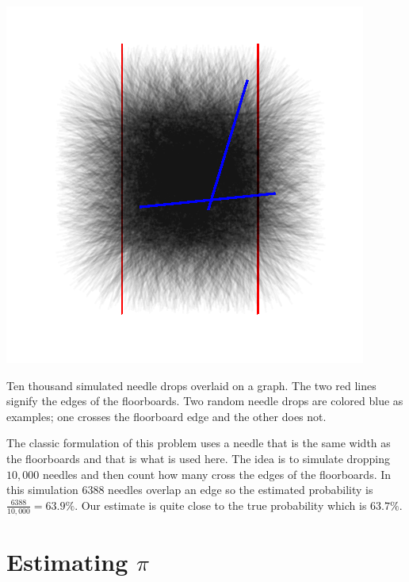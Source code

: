\documentclass{tufte-handout}
\begin{document}
\begin{marginfigure}[-.2in]
  \includegraphics[width=\linewidth]{Rplot02}
  \caption{Ten thousand simulated needle drops overlaid on a graph. The two red lines signify the edges of the floorboards. Two random needle drops are colored blue as examples; one crosses the floorboard edge and the other does not.}
  \label{sim}
\end{marginfigure}

\noindent The classic formulation of this problem uses a needle that is the same width as the floorboards and that is what is used here. The idea is to simulate dropping $10,000$ needles and then count how many cross the edges of the floorboards. In this simulation $6388$ needles overlap an edge so the estimated probability is $ \frac{6388}{10,000} = 63.9\%$. Our estimate is quite close to the true probability which is $63.7\%$.



\section{Estimating $\pi$}
\end{document}

